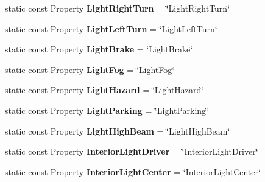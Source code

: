 \begin{DoxyCompactItemize}
\item 
\hypertarget{classVehicleProperty_a73cfc2a3afd2dc81f495936dfcf46793}{static const Property {\bfseries Light\-Right\-Turn} = \char`\"{}Light\-Right\-Turn\char`\"{}}\label{classVehicleProperty_a73cfc2a3afd2dc81f495936dfcf46793}

\item 
\hypertarget{classVehicleProperty_a4430db4d7c36d7d047766d88f9fc977c}{static const Property {\bfseries Light\-Left\-Turn} = \char`\"{}Light\-Left\-Turn\char`\"{}}\label{classVehicleProperty_a4430db4d7c36d7d047766d88f9fc977c}

\item 
\hypertarget{classVehicleProperty_aa4f2ae234bd0d045b95cf9980e980dd5}{static const Property {\bfseries Light\-Brake} = \char`\"{}Light\-Brake\char`\"{}}\label{classVehicleProperty_aa4f2ae234bd0d045b95cf9980e980dd5}

\item 
\hypertarget{classVehicleProperty_a6eb38fc244331a26b487f7f9beb69b0c}{static const Property {\bfseries Light\-Fog} = \char`\"{}Light\-Fog\char`\"{}}\label{classVehicleProperty_a6eb38fc244331a26b487f7f9beb69b0c}

\item 
\hypertarget{classVehicleProperty_a0d3992f2e0e50bb74baa5e670f6111f0}{static const Property {\bfseries Light\-Hazard} = \char`\"{}Light\-Hazard\char`\"{}}\label{classVehicleProperty_a0d3992f2e0e50bb74baa5e670f6111f0}

\item 
\hypertarget{classVehicleProperty_a144920830af1df5a59433f98ebd29504}{static const Property {\bfseries Light\-Parking} = \char`\"{}Light\-Parking\char`\"{}}\label{classVehicleProperty_a144920830af1df5a59433f98ebd29504}

\item 
\hypertarget{classVehicleProperty_acce36f505d4b0233c753f0d5f568e255}{static const Property {\bfseries Light\-High\-Beam} = \char`\"{}Light\-High\-Beam\char`\"{}}\label{classVehicleProperty_acce36f505d4b0233c753f0d5f568e255}

\item 
\hypertarget{classVehicleProperty_a16b99ec2210fd4ca509a00e59b80f8c0}{static const Property {\bfseries Interior\-Light\-Driver} = \char`\"{}Interior\-Light\-Driver\char`\"{}}\label{classVehicleProperty_a16b99ec2210fd4ca509a00e59b80f8c0}

\item 
\hypertarget{classVehicleProperty_a86c0bb4ab676e06e3c807d90c92e7240}{static const Property {\bfseries Interior\-Light\-Center} = \char`\"{}Interior\-Light\-Center\char`\"{}}\label{classVehicleProperty_a86c0bb4ab676e06e3c807d90c92e7240}


\end{DoxyCompactItemize}
